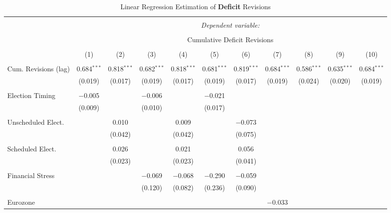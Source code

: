 
\begin{table}[!htbp] \centering 
  \caption{Linear Regression Estimation of \textbf{Deficit} Revisions} 
  \label{deficit_results} 
\tiny 
\begin{tabular}{@{\extracolsep{5pt}}lcccccccccc} 
\\[-1.8ex]\hline 
\hline \\[-1.8ex] 
 & \multicolumn{10}{c}{\textit{Dependent variable:}} \\ 
\cline{2-11} 
\\[-1.8ex] & \multicolumn{10}{c}{Cumulative Deficit Revisions} \\ 
\\[-1.8ex] & (1) & (2) & (3) & (4) & (5) & (6) & (7) & (8) & (9) & (10)\\ 
\hline \\[-1.8ex] 
 Cum. Revisions (lag) & 0.684$^{***}$ & 0.818$^{***}$ & 0.682$^{***}$ & 0.818$^{***}$ & 0.681$^{***}$ & 0.819$^{***}$ & 0.684$^{***}$ & 0.586$^{***}$ & 0.635$^{***}$ & 0.684$^{***}$ \\ 
  & (0.019) & (0.017) & (0.019) & (0.017) & (0.019) & (0.017) & (0.019) & (0.024) & (0.020) & (0.019) \\ 
  & & & & & & & & & & \\ 
 Election Timing & $-$0.005 &  & $-$0.006 &  & $-$0.021 &  &  &  &  &  \\ 
  & (0.009) &  & (0.010) &  & (0.017) &  &  &  &  &  \\ 
  & & & & & & & & & & \\ 
 Unscheduled Elect. &  & 0.010 &  & 0.009 &  & $-$0.073 &  &  &  &  \\ 
  &  & (0.042) &  & (0.042) &  & (0.075) &  &  &  &  \\ 
  & & & & & & & & & & \\ 
 Scheduled Elect. &  & 0.026 &  & 0.021 &  & 0.056 &  &  &  &  \\ 
  &  & (0.023) &  & (0.023) &  & (0.041) &  &  &  &  \\ 
  & & & & & & & & & & \\ 
 Financial Stress &  &  & $-$0.069 & $-$0.068 & $-$0.290 & $-$0.059 &  &  &  &  \\ 
  &  &  & (0.120) & (0.082) & (0.236) & (0.090) &  &  &  &  \\ 
  & & & & & & & & & & \\ 
 Eurozone &  &  &  &  &  &  & $-$0.033 &  &  &  \\ 

\end{tabular}
\end{table}

